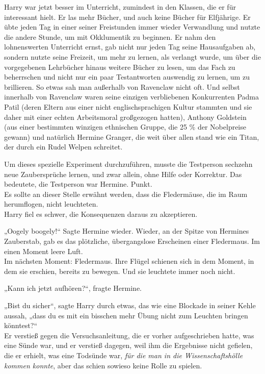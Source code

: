 {Harry war jetzt besser im Unterricht, zumindest in den Klassen, die er für interessant hielt. Er las mehr Bücher, und auch keine Bücher für Elfjährige. Er übte jeden Tag in einer seiner Freistunden immer wieder Verwandlung und nutzte die andere Stunde, um mit Okklumentik zu beginnen. Er nahm den lohnenswerten Unterricht ernst, gab nicht nur jeden Tag seine Hausaufgaben ab, sondern nutzte seine Freizeit, um mehr zu lernen, als verlangt wurde, um über die vorgegebenen Lehrbücher hinaus weitere Bücher zu lesen, um das Fach zu beherrschen und nicht nur ein paar Testantworten auswendig zu lernen, um zu brillieren. So etwas sah man außerhalb von Ravenclaw nicht oft. Und selbst innerhalb von Ravenclaw waren seine einzigen verbliebenen Konkurrenten Padma Patil (deren Eltern aus einer nicht englischsprachigen Kultur stammten und sie daher mit einer echten Arbeitsmoral großgezogen hatten), Anthony Goldstein (aus einer bestimmten winzigen ethnischen Gruppe, die 25 \% der Nobelpreise gewann) und natürlich Hermine Granger, die weit über allen stand wie ein Titan, der durch ein Rudel Welpen schreitet.

Um dieses spezielle Experiment durchzuführen, musste die Testperson sechzehn neue Zaubersprüche lernen, und zwar allein, ohne Hilfe oder Korrektur. Das bedeutete, die Testperson war Hermine. Punkt.\\ Es sollte an dieser Stelle erwähnt werden, dass die Fledermäuse, die im Raum herumflogen, nicht leuchteten.\\ Harry fiel es schwer, die Konsequenzen daraus zu akzeptieren.

„Oogely boogely!“ Sagte Hermine wieder. Wieder, an der Spitze von Hermines Zauberstab, gab es das plötzliche, übergangslose Erscheinen einer Fledermaus. Im einen Moment leere Luft.\\ Im nächsten Moment: Fledermaus. Ihre Flügel schienen sich in dem Moment, in dem sie erschien, bereits zu bewegen. Und sie leuchtete immer noch nicht.

„Kann ich jetzt aufhören?“, fragte Hermine.

„Bist du sicher“, sagte Harry durch etwas, das wie eine Blockade in seiner Kehle aussah, „dass du es mit ein bisschen mehr Übung nicht zum Leuchten bringen könntest?“\\ Er verstieß gegen die Versuchsanleitung, die er vorher aufgeschrieben hatte, was eine Sünde war, und er verstieß dagegen, weil ihm die Ergebnisse nicht gefielen, die er erhielt, was eine Todsünde war, \emph{für die man in die Wissenschaftshölle kommen konnte}, aber das schien sowieso keine Rolle zu spielen.

}
